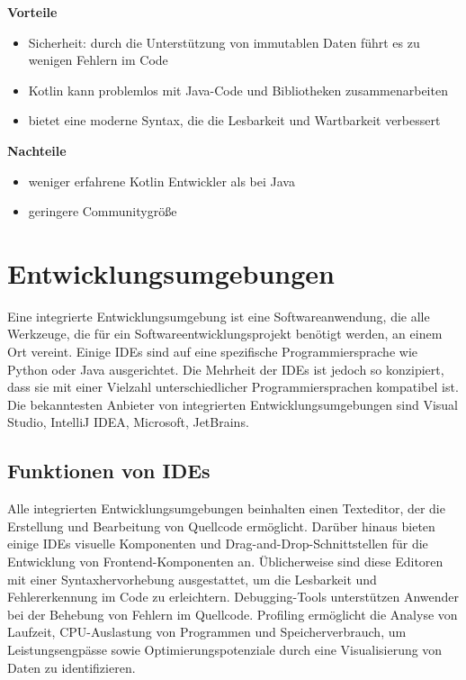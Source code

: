 \textbf{Vorteile}
\begin{itemize}
	\item Sicherheit: durch die Unterstützung von immutablen Daten führt es zu wenigen Fehlern im Code
	\item Kotlin kann problemlos mit Java-Code und Bibliotheken zusammenarbeiten
	\item bietet eine moderne Syntax, die die Lesbarkeit und Wartbarkeit verbessert
\end{itemize}

\textbf{Nachteile}
\begin{itemize}
	\item weniger erfahrene Kotlin Entwickler als bei Java
	\item geringere Communitygröße
\end{itemize}


\section{Entwicklungsumgebungen}
Eine integrierte Entwicklungsumgebung ist eine Softwareanwendung, die alle Werkzeuge, die für ein Softwareentwicklungsprojekt benötigt werden, an einem Ort vereint. Einige IDEs sind auf eine spezifische Programmiersprache wie Python oder Java ausgerichtet. Die Mehrheit der IDEs ist jedoch so konzipiert, dass sie mit einer Vielzahl unterschiedlicher Programmiersprachen kompatibel ist. Die bekanntesten Anbieter von integrierten Entwicklungsumgebungen sind Visual Studio, IntelliJ IDEA, Microsoft, JetBrains. 

\subsection{Funktionen von IDEs}
Alle integrierten Entwicklungsumgebungen beinhalten einen Texteditor, der die Erstellung und Bearbeitung von Quellcode ermöglicht. Darüber hinaus bieten einige IDEs visuelle Komponenten und Drag-and-Drop-Schnittstellen für die Entwicklung von Frontend-Komponenten an. Üblicherweise sind diese Editoren mit einer Syntaxhervorhebung ausgestattet, um die Lesbarkeit und Fehlererkennung im Code zu erleichtern. Debugging-Tools unterstützen Anwender bei der Behebung von Fehlern im Quellcode. Profiling ermöglicht die Analyse von Laufzeit, CPU-Auslastung von Programmen und Speicherverbrauch, um Leistungsengpässe sowie Optimierungspotenziale durch eine Visualisierung von Daten zu identifizieren. 

